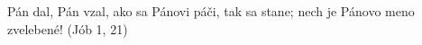 Pán dal, Pán vzal, ako sa Pánovi páči, tak sa stane;
nech je Pánovo meno \newline zvelebené! (Jób 1, 21)
